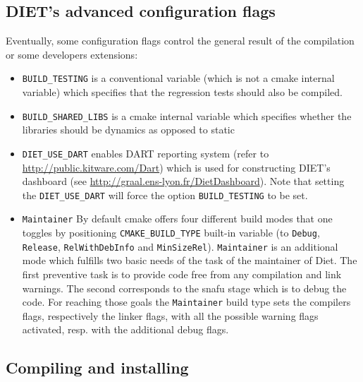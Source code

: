 \subsection{DIET's advanced configuration flags}
\noindent

Eventually, some configuration flags control the general result of the
compilation or some developers extensions:
\begin{itemize}
\item
  \verb+BUILD_TESTING+ is a conventional variable (which is not a cmake
  internal variable) which specifies that the regression tests should
  also be compiled.

\item
  \verb+BUILD_SHARED_LIBS+ is a cmake internal variable which specifies
  whether the libraries should be dynamics as opposed to static

\item
  \verb+DIET_USE_DART+ enables DART reporting system (refer to 
  \url{http://public.kitware.com/Dart}) which is used for constructing
  DIET's dashboard (see \url{http://graal.ens-lyon.fr/DietDashboard}).
  Note that setting the \verb+DIET_USE_DART+ will force the option
  \linebreak\verb+BUILD_TESTING+ to be set.

\item
  \verb+Maintainer+ By default cmake offers four different build modes
  that one toggles by positioning \verb+CMAKE_BUILD_TYPE+ built-in
  variable (to \verb+Debug+, \verb+Release+, \verb+RelWithDebInfo+
  and \verb+MinSizeRel+).
  \verb+Maintainer+ is an additional mode which fulfills two basic needs
  of the task of the maintainer of Diet.
  The first preventive task is to provide code free from any compilation
  and link warnings.
  The second corresponds to the snafu stage which is to debug the code.
  For reaching those goals the \verb+Maintainer+ build type sets the
  compilers flags, respectively the linker flags, with all the possible
  warning flags activated, resp. with the additional debug flags.
\end{itemize}

\subsection{Compiling and installing}

